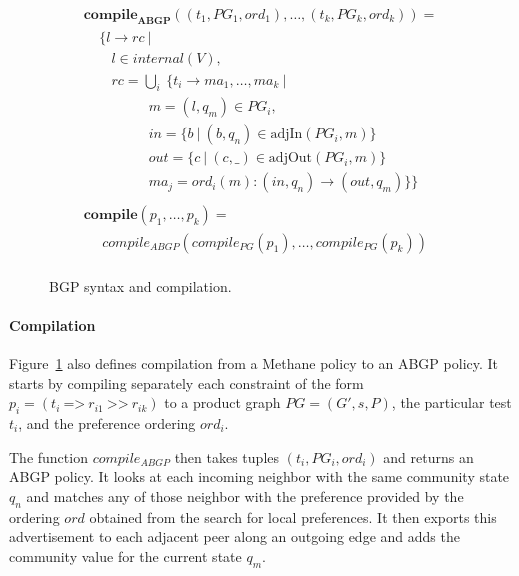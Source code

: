 \documentclass[twocolumn, openany]{sig-alternate-10pt}
\newcommand{\sysname}{{\small \sf Methane}\xspace}
\newcommand{\para}[1]{\paragraph*{\textbf{#1}}}
\newcommand{\Prefer}{\texttt{>>}}
\newcommand{\Path}{\texttt{=>}}
\begin{document}
\begin{figure}[h!]
\begin{minipage}[t]{.5\linewidth}
  \end{minipage}
  ~~
  \vrule
  ~~
  \begin{minipage}[t]{.5\linewidth}
  \vspace*{-1\baselineskip}
  \[ \begin{array}{l}
     \textbf{compile}_\textbf{ABGP}( (t_1,PG_1,ord_1), \dots, (t_k,PG_k,ord_k) ) = \\
     ~~~~~ \{ l \rightarrow rc ~\vert~ \\
     ~~~~~~~~~ l \in internal(V), \\
     ~~~~~~~~~ rc = \bigcup_i~ \{ t_i \rightarrow ma_1, \dots, ma_k ~\vert~ \\
     ~~~~~~~~~~~~~~~~~~~~~ m = (l,q_m) \in PG_i, \\
     ~~~~~~~~~~~~~~~~~~~~~ in = \{ b ~\vert~ (b,q_n) \in \text{adjIn}(PG_i,m) \} \\
     ~~~~~~~~~~~~~~~~~~~~~ out = \{ c ~\vert~ (c,\_) \in \text{adjOut}(PG_i,m) \} \\
     ~~~~~~~~~~~~~~~~~~~~~ ma_j = ord_i(m) : (in,q_n) \rightarrow (out,q_m) \} \} \\
     \\
     \textbf{compile}( p_1, \dots, p_k ) = \\
     ~~~~~~ compile_{ABGP}(compile_{PG}(p_1), \dots, compile_{PG}(p_k)) \\
  \end{array} \]%

  \end{minipage}

  \vspace{1em}
  \hrulefill%
  \vspace{1em}

  \caption{BGP syntax and compilation.}
  \label{fig:abgp-syntax}
\end{figure}%


\para{Compilation}

Figure~\ref{fig:abgp-syntax} also defines compilation from a \sysname policy to an ABGP policy. It starts by compiling separately each constraint of the form $p_i = (t_i ~\Path~ r_{i1} ~\Prefer~ r_{ik})$ to a product graph $PG = (G', s, P)$, the particular test $t_i$, and the preference ordering $ord_i$. 

The function $compile_{ABGP}$ then takes tuples $(t_i, PG_i, ord_i)$ and returns an ABGP policy. It looks at each incoming neighbor with the same community state $q_n$ and matches any of those neighbor with the preference provided by the ordering $ord$ obtained from the search for local preferences. It then exports this advertisement to each adjacent peer along an outgoing edge and adds the community value for the current state $q_m$.
\end{document}
